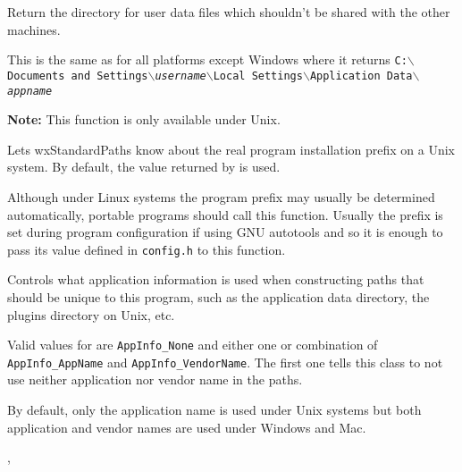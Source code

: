 \label{wxstandardpathsgetuserlocaldatadir}


Return the directory for user data files which shouldn't be shared with
the other machines.

This is the same as  for
all platforms except Windows where it returns
\texttt{C:$\backslash$Documents and Settings$\backslash$\textit{username}$\backslash$Local Settings$\backslash$Application Data$\backslash$\textit{appname}}


\label{wxstandardpathssetinstallprefix}


\textbf{Note:} This function is only available under Unix.

Lets wxStandardPaths know about the real program installation prefix on a Unix
system. By default, the value returned by
 is used.

Although under Linux systems the program prefix may usually be determined
automatically, portable programs should call this function. Usually the prefix
is set during program configuration if using GNU autotools and so it is enough
to pass its value defined in \texttt{config.h} to this function.


\label{wxstandardpathsuseappinfo}


Controls what application information is used when constructing paths that
should be unique to this program, such as the application data directory, the
plugins directory on Unix, etc.

Valid values for  are \texttt{AppInfo\_None} and either one or
combination of \texttt{AppInfo\_AppName} and \texttt{AppInfo\_VendorName}. The
first one tells this class to not use neither application nor vendor name in
the paths.

By default, only the application name is used under Unix systems but both
application and vendor names are used under Windows and Mac.


, 

